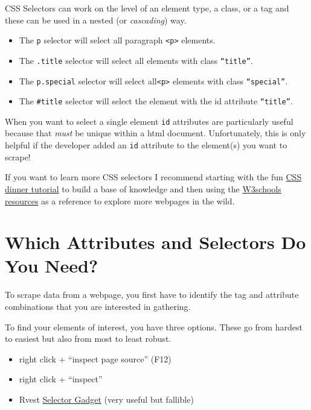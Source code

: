\documentclass[
  12pt,
]{book}
\providecommand{\tightlist}{%
  \setlength{\itemsep}{0pt}\setlength{\parskip}{0pt}}
\begin{document}
CSS Selectors can work on the level of an element type, a class, or a tag and these can be used in a nested (or \emph{cascading}) way.

\begin{itemize}
\item
  The \texttt{p} selector will select all paragraph \texttt{\textless{}p\textgreater{}} elements.
\item
  The \texttt{.title} selector will select all elements with class \texttt{“title”}.
\item
  The \texttt{p.special} selector will select all\texttt{\textless{}p\textgreater{}} elements with class \texttt{“special”}.
\item
  The \texttt{\#title} selector will select the element with the id attribute \texttt{“title”}.
\end{itemize}

When you want to select a single element \texttt{id} attributes are particularly useful because that \emph{must} be unique within a html document. Unfortunately, this is only helpful if the developer added an \texttt{id} attribute to the element(s) you want to scrape!

If you want to learn more CSS selectors I recommend starting with the fun \href{https://flukeout.github.io/}{CSS dinner tutorial} to build a base of knowledge and then using the \href{https://www.w3schools.com/css/default.asp}{W3schools resources} as a reference to explore more webpages in the wild.

\hypertarget{which-attributes-and-selectors-do-you-need}{%
\section{Which Attributes and Selectors Do You Need?}\label{which-attributes-and-selectors-do-you-need}}

To scrape data from a webpage, you first have to identify the tag and attribute combinations that you are interested in gathering.

To find your elements of interest, you have three options. These go from hardest to easiest but also from most to least robust.

\begin{itemize}
\tightlist
\item
  right click + ``inspect page source'' (F12)
\item
  right click + ``inspect''
\item
  Rvest \href{https://rvest.tidyverse.org/articles/selectorgadget.html}{Selector Gadget} (very useful but fallible)
\end{itemize}
\end{document}
